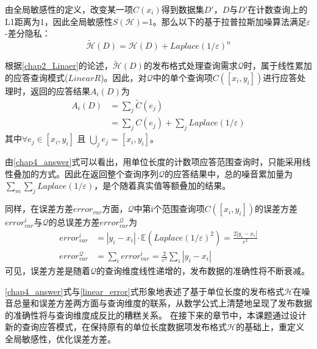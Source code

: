 由全局敏感性的定义，改变某一项$C(x_{i})$得到数据集$D'$，$D$与$D'$在计数查询上的L1距离为1，因此全局敏感性$S(\mathcal{H})$=1。那么以下的基于拉普拉斯加噪算法满足$\varepsilon$-差分隐私：
\begin{equation}
	\label{chap4_lap}
	\tilde{\mathcal{H}}(D) = \mathcal{H}(D) + \textit{Laplace}(1/\varepsilon)^n
\end{equation}

根据\ref{chap2_Linaer}的论述，$\tilde{\mathcal{H}}(D)$的发布格式处理查询需求$\mathcal{Q}$时，属于线性累加的应答查询模式($LinearR$)。因此，对$\mathcal{Q}$中的单个查询项$C([x_{i},y_{i}])$进行应答处理时，返回的应答结果$A_{i}(D)$为
\begin{equation}
\label{chap4_answer}
\begin{split}
	A_{i}(D) &= \sum\limits_j \widetilde{C}(e_{j})\\
			 &= \sum\limits_j C(e_{j}) + \sum\limits_j \textit{Laplace}(1/\varepsilon)
\end{split}	
\end{equation}
其中$ \forall e_{j} \in [x_{i},y_{i}]$ 且 $\bigcup\limits_j e_{j}$ = $[x_{i},y_{i}]$。


由\ref{chap4_answer}式可以看出，用单位长度的计数项应答范围查询时，只能采用线性叠加的方式。因此在返回整个查询序列$\mathcal{Q}$的应答结果中，总的噪音累加量为$\sum\limits_m {\sum\limits_j \textit{Laplace}(1/\varepsilon)}$，是个随着真实值等额叠加的结果。

同样，在误差方差$error_{var}$方面，$\mathcal{Q}$中第i个范围查询项$C([x_{i},y_{i}])$的误差方差$error_{var}^{i}$与$\mathcal{Q}$的总误差方差$error_{var}^{\mathcal{Q}}$为
\begin{equation}
\label{linear_error}
\begin{split}
	error_{var}^{i} &= |y_{i}-x_{i}| \cdotp \mathbb{E}(\textit{Laplace}(1/ \varepsilon)^2) = \frac{2|y_{i}-x_{i}|}{\varepsilon^2} \\
	error_{var}^{\mathcal{Q}} &= \sum\limits_i error_{var}^{i} = \frac{2}{\varepsilon^2}\sum\limits_i |y_{i}-x_{i}|
\end{split}
\end{equation}
可见，误差方差是随着$\mathcal{Q}$的查询维度线性递增的，发布数据的准确性将不断衰减。

\ref{chap4_answer}式与\ref{linear_error}式形象地表述了基于单位长度的发布格式$\mathcal{H}$在噪音总量和误差方差两方面与查询维度的联系，从数学公式上清楚地呈现了发布数据的准确性将与查询维度成反比的糟糕关系。
在接下来的章节中，本课题通过设计新的查询应答模式，在保持原有的单位长度数据项发布格式$\mathcal{H}$的基础上，重定义全局敏感性，优化误差方差。


